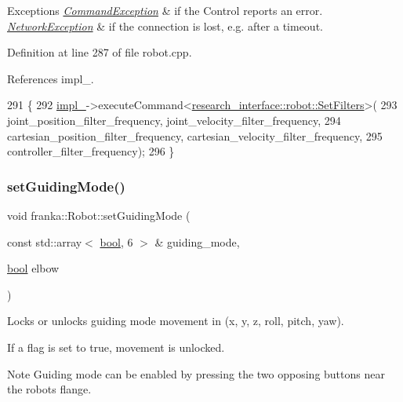 \begin{DoxyExceptions}{Exceptions}
{\em \hyperlink{structfranka_1_1CommandException}{Command\+Exception}} & if the Control reports an error. \\
\hline
{\em \hyperlink{structfranka_1_1NetworkException}{Network\+Exception}} & if the connection is lost, e.\+g. after a timeout. \\
\hline
\end{DoxyExceptions}


Definition at line 287 of file robot.\+cpp.



References impl\+\_\+.


\begin{DoxyCode}
291                                                            \{
292   \hyperlink{classfranka_1_1Robot_aca155054184e5b6478942fd6a1b82ba4}{impl\_}->executeCommand<\hyperlink{structresearch__interface_1_1robot_1_1SetFilters}{research\_interface::robot::SetFilters}>(
293       joint\_position\_filter\_frequency, joint\_velocity\_filter\_frequency,
294       cartesian\_position\_filter\_frequency, cartesian\_velocity\_filter\_frequency,
295       controller\_filter\_frequency);
296 \}
\end{DoxyCode}
\mbox{\label{classfranka_1_1Robot_a7992cee203e66f9a61fe2f318ef88a26}} 
\subsubsection{\texorpdfstring{set\+Guiding\+Mode()}{setGuidingMode()}}
{\footnotesize\ttfamily void franka\+::\+Robot\+::set\+Guiding\+Mode (\begin{DoxyParamCaption}\item[{const std\+::array$<$ \hyperlink{classbool}{bool}, 6 $>$ \&}]{guiding\+\_\+mode,  }\item[{\hyperlink{classbool}{bool}}]{elbow }\end{DoxyParamCaption})}

Locks or unlocks guiding mode movement in (x, y, z, roll, pitch, yaw).

If a flag is set to true, movement is unlocked.

\begin{DoxyNote}{Note}
Guiding mode can be enabled by pressing the two opposing buttons near the robot\textquotesingle{}s flange.
\end{DoxyNote}

